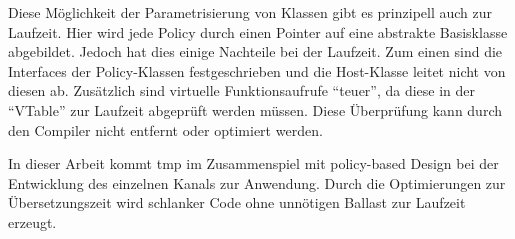 

Diese Möglichkeit der Parametrisierung von Klassen gibt es prinzipell auch zur Laufzeit. Hier wird jede Policy durch einen Pointer auf eine abstrakte Basisklasse abgebildet. Jedoch hat dies einige Nachteile bei der Laufzeit. Zum einen sind die Interfaces der Policy-Klassen festgeschrieben und die Host-Klasse leitet nicht von diesen ab. Zusätzlich sind virtuelle Funktionsaufrufe \enquote{teuer}, da diese in der \enquote{VTable} zur Laufzeit abgeprüft werden müssen. Diese Überprüfung kann durch den Compiler nicht entfernt oder optimiert werden. 


In dieser Arbeit kommt \ac{tmp} im Zusammenspiel mit policy-based Design bei der Entwicklung des einzelnen Kanals zur Anwendung. Durch die Optimierungen zur Übersetzungszeit wird schlanker Code ohne unnötigen Ballast zur Laufzeit erzeugt.
